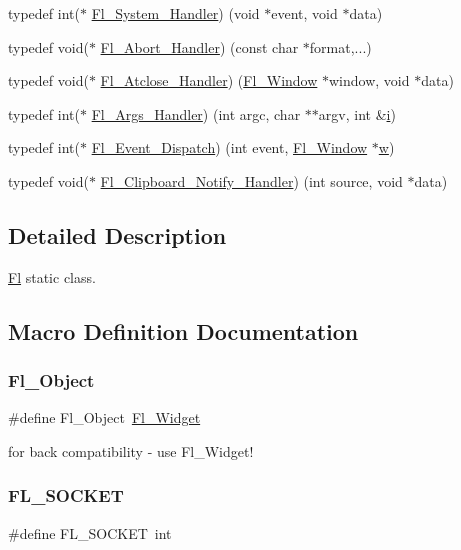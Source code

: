 \begin{DoxyCompactItemize}
\item 
typedef int($\ast$ \hyperlink{group__callback__functions_ga0cd86d9a18073304779213e82747ac8a}{Fl\+\_\+\+System\+\_\+\+Handler}) (void $\ast$event, void $\ast$data)
\item 
typedef void($\ast$ \hyperlink{group__callback__functions_gab06d501e53b8fe82de6d70937fb22f95}{Fl\+\_\+\+Abort\+\_\+\+Handler}) (const char $\ast$format,...)
\item 
typedef void($\ast$ \hyperlink{group__callback__functions_gac2b36f6e136744adb3e3ec87e068c169}{Fl\+\_\+\+Atclose\+\_\+\+Handler}) (\hyperlink{class_fl___window}{Fl\+\_\+\+Window} $\ast$window, void $\ast$data)
\item 
typedef int($\ast$ \hyperlink{group__callback__functions_ga6cb5354ccaa2a6619f2408dbb5203f3b}{Fl\+\_\+\+Args\+\_\+\+Handler}) (int argc, char $\ast$$\ast$argv, int \&\hyperlink{forms_8_h_acb559820d9ca11295b4500f179ef6392}{i})
\item 
typedef int($\ast$ \hyperlink{group__callback__functions_ga2fa80da592860bc4c0c1a06d36262601}{Fl\+\_\+\+Event\+\_\+\+Dispatch}) (int event, \hyperlink{class_fl___window}{Fl\+\_\+\+Window} $\ast$\hyperlink{forms_8_h_aac374e320caaadeca4874add33b62af2}{w})
\item 
typedef void($\ast$ \hyperlink{group__callback__functions_gae5e26cbad23960ff7ce4d50d82c74750}{Fl\+\_\+\+Clipboard\+\_\+\+Notify\+\_\+\+Handler}) (int source, void $\ast$data)
\end{DoxyCompactItemize}


\subsection{Detailed Description}
\hyperlink{class_fl}{Fl} static class. 

\subsection{Macro Definition Documentation}
\mbox{\label{_fl_8_h_a659763c4f9798b5b955974b8152b48eb}} 
\subsubsection{\texorpdfstring{Fl\+\_\+\+Object}{Fl\_Object}}
{\footnotesize\ttfamily \#define Fl\+\_\+\+Object~\hyperlink{class_fl___widget}{Fl\+\_\+\+Widget}}

for back compatibility -\/ use Fl\+\_\+\+Widget! \mbox{\label{_fl_8_h_a02134b1207d9eb2dce7f6f70e76c199a}} 
\subsubsection{\texorpdfstring{F\+L\+\_\+\+S\+O\+C\+K\+ET}{FL\_SOCKET}}
{\footnotesize\ttfamily \#define F\+L\+\_\+\+S\+O\+C\+K\+ET~int}

